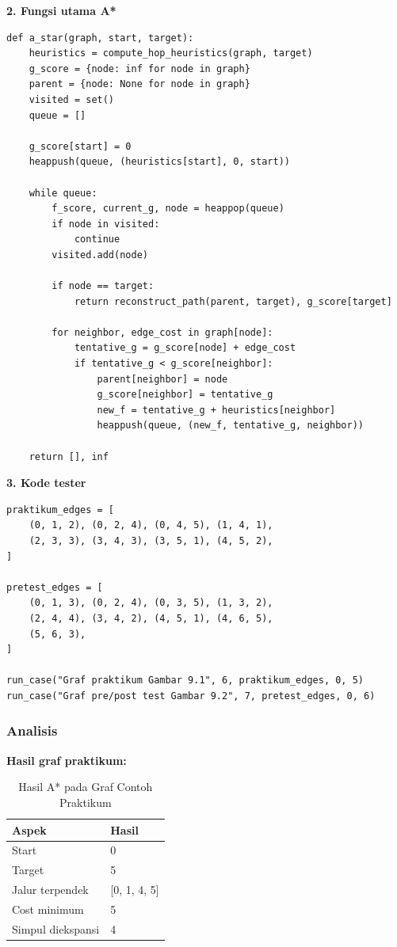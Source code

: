 \textbf{2. Fungsi utama A*}
\begin{lstlisting}[basicstyle=\ttfamily\scriptsize, frame=single, backgroundcolor=\color{white}, numbers=none, keywordstyle=\color{black}, commentstyle=\color{black}, stringstyle=\color{black}, breaklines=true]
def a_star(graph, start, target):
    heuristics = compute_hop_heuristics(graph, target)
    g_score = {node: inf for node in graph}
    parent = {node: None for node in graph}
    visited = set()
    queue = []

    g_score[start] = 0
    heappush(queue, (heuristics[start], 0, start))

    while queue:
        f_score, current_g, node = heappop(queue)
        if node in visited:
            continue
        visited.add(node)

        if node == target:
            return reconstruct_path(parent, target), g_score[target]

        for neighbor, edge_cost in graph[node]:
            tentative_g = g_score[node] + edge_cost
            if tentative_g < g_score[neighbor]:
                parent[neighbor] = node
                g_score[neighbor] = tentative_g
                new_f = tentative_g + heuristics[neighbor]
                heappush(queue, (new_f, tentative_g, neighbor))

    return [], inf
\end{lstlisting}

\textbf{3. Kode tester}
\begin{lstlisting}[basicstyle=\ttfamily\scriptsize, frame=single, backgroundcolor=\color{white}, numbers=none, keywordstyle=\color{black}, commentstyle=\color{black}, stringstyle=\color{black}, breaklines=true]
praktikum_edges = [
    (0, 1, 2), (0, 2, 4), (0, 4, 5), (1, 4, 1),
    (2, 3, 3), (3, 4, 3), (3, 5, 1), (4, 5, 2),
]

pretest_edges = [
    (0, 1, 3), (0, 2, 4), (0, 3, 5), (1, 3, 2),
    (2, 4, 4), (3, 4, 2), (4, 5, 1), (4, 6, 5),
    (5, 6, 3),
]

run_case("Graf praktikum Gambar 9.1", 6, praktikum_edges, 0, 5)
run_case("Graf pre/post test Gambar 9.2", 7, pretest_edges, 0, 6)
\end{lstlisting}

\subsubsection*{Analisis}
\textbf{Hasil graf praktikum:}
\begin{table}[H]
    \centering
    \caption{Hasil A* pada Graf Contoh Praktikum}
    \label{tab:praktikum9-hasil-praktikum}
    \begin{tabular}{ll}
    \toprule
    \textbf{Aspek} & \textbf{Hasil} \\ \midrule
    Start & 0 \\
    Target & 5 \\
    Jalur terpendek & [0, 1, 4, 5] \\
    Cost minimum & 5 \\
    Simpul diekspansi & 4 \\ \bottomrule
    \end{tabular}
\end{table}

